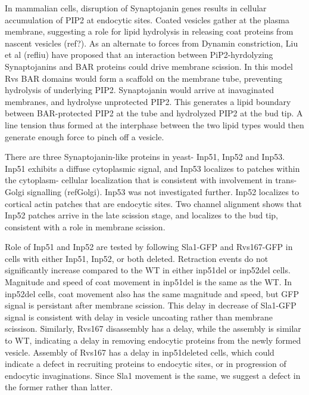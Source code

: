 \documentclass[9pt,lineno]{elife}
\begin{document}
In mammalian cells, disruption of Synaptojanin genes results in cellular accumulation of PIP2 at endocytic sites. Coated vesicles gather at the plasma membrane, suggesting a role for lipid hydrolysis in releasing coat proteins from nascent vesicles (ref?). As an alternate to forces from Dynamin constriction, Liu et al (refliu) have proposed that an interaction between PiP2-hyrdolyzing Synaptojanins and BAR proteins could drive membrane scission. In this model Rvs BAR domains would form a scaffold on the membrane tube, preventing hydrolysis of underlying PIP2. Synaptojanin would arrive at inavaginated membranes, and hydrolyse unprotected PIP2. This generates a lipid boundary between BAR-protected PIP2 at the tube and hydrolyzed PIP2 at the bud tip. A line tension thus formed at the interphase between the two lipid types would then generate enough force to pinch off a vesicle.




There are three Synaptojanin-like proteins in yeast- Inp51, Inp52 and Inp53. Inp51 exhibits a diffuse cytoplasmic signal, and Inp53 localizes to patches within the cytoplasm- cellular localization that is consistent with involvement in trans-Golgi signalling (refGolgi). Inp53 was not investigated further. Inp52 localizes to cortical actin patches that are endocytic sites. Two channel alignment shows that Inp52 patches arrive in the late scission stage, and localizes to the bud tip, consistent with a role in membrane scission. 

Role of Inp51 and Inp52 are tested by following Sla1-GFP and Rvs167-GFP in cells with either Inp51, Inp52, or both deleted. Retraction events do not significantly increase compared to the WT in either inp51del or inp52del cells. Magnitude and speed of coat movement in inp51del is the same as the WT. In inp52del cells, coat movement also has the same magnitude and speed, but GFP signal is persistant after membrane scission. This delay in decrease of Sla1-GFP signal is consistent with delay in vesicle uncoating rather than membrane scissison. Similarly, Rvs167 disassembly has a delay, while the assembly is similar to WT, indicating a delay in removing endocytic proteins from the newly formed vesicle. Assembly of Rvs167 has a delay in inp51deleted cells, which could indicate a defect in recruiting proteins to endocytic sites, or in progression of endocytic invaginations. Since Sla1 movement is the same, we suggest a defect in the former rather than latter. 


\end{document}
